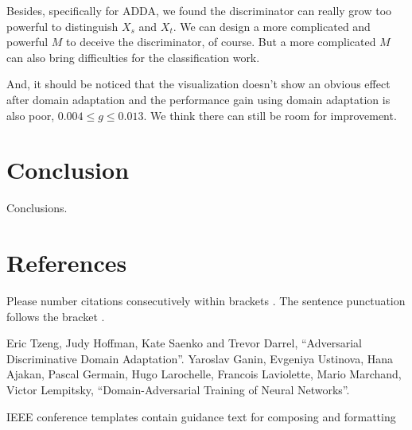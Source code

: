 \documentclass[conference]{IEEEtran}
\begin{document}
Besides, specifically for ADDA, we found the discriminator can really grow too powerful to distinguish $X_s$ and $X_t$. We can design a more complicated and powerful $M$ to deceive the discriminator, of course. But a more complicated $M$ can also bring difficulties for the classification work.

And, it should be noticed that the visualization doesn't show an obvious effect after domain adaptation and the performance gain using domain adaptation is also poor, $0.004 \leq g \leq 0.013$. We think there can still be room for improvement.


\section{Conclusion}
Conclusions.


\section*{References}

Please number citations consecutively within brackets \cite{b1}. The
sentence punctuation follows the bracket \cite{b2}.

\begin{thebibliography}{00}
 Eric Tzeng, Judy Hoffman, Kate Saenko and Trevor Darrel, ``Adversarial Discriminative Domain Adaptation''.
 Yaroslav Ganin, Evgeniya Ustinova, Hana Ajakan, Pascal Germain, Hugo Larochelle, Francois Laviolette,
    Mario Marchand, Victor Lempitsky, ``Domain-Adversarial Training of Neural Networks''.
\end{thebibliography}
\vspace{12pt}
\color{red}
IEEE conference templates contain guidance text for composing and formatting
\end{document}
